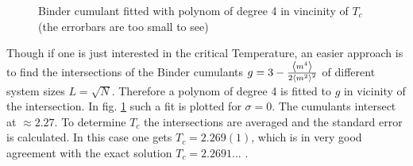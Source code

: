     \begin{figure}[htbp]
        \centering
        \caption[Examples of determining critical temperature and exponents]
                {
                  Binder cumulant fitted with
                    polynom of degree 4 in vincinity of \(T_c\)
                    (the errorbars are too small to see)}
        \label{fig:binder_fit_s_0}
    \end{figure}
    Though if one is just interested in the critical Temperature, an
    easier approach is to find the intersections of the Binder cumulants
    \(g = 3-\frac{\left< m^4 \right>}{2\left< m^2 \right>^2}\) \cite{Binder1981} of different
    system sizes \(L=\sqrt N\).
    Therefore a polynom of degree 4 is fitted to \(g\) in vicinity of
    the intersection.
    In fig. \ref{fig:binder_fit_s_0} such a fit is plotted for
    \(\sigma=0\). The cumulants intersect at \(\approx 2.27\).
    To determine \(T_c\) the intersections are averaged and the standard
    error is calculated. In this case one gets \(T_c = 2.269(1)\), which
    is in very good agreement with the exact solution
    \(T_c = 2.2691...\) \cite{Onsager1944}.\\


